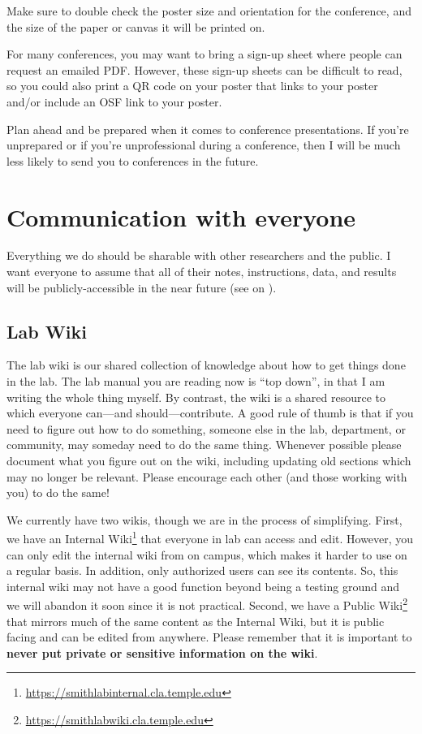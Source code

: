\documentclass[letterpaper,12pt,oneside]{memoir}
\begin{document}
Make sure to double check the poster size and orientation for the conference, and the size of the paper or canvas it will be printed on.

For many conferences, you may want to bring a sign-up sheet where people can request an emailed PDF. However, these sign-up sheets can be difficult to read, so you could also print a QR code on your poster that links to your poster and/or include an OSF link to your poster.

\begin{shaded}
\noindent Plan ahead and be prepared when it comes to conference presentations. If you're unprepared or if you're unprofessional during a conference, then I will be much less likely to send you to conferences in the future.
\end{shaded}


\section{Communication with everyone}
Everything we do should be sharable with other researchers and the public. I want everyone to assume that all of their notes, instructions, data, and results will be publicly-accessible in the near future (see  on ). 

\subsection{Lab Wiki}
\label{sec:wiki}

The lab wiki is our shared collection of knowledge about how to get things done in the lab. The lab manual you are reading now is ``top down'', in that I am writing the whole thing myself. By contrast, the wiki is a shared resource to which everyone can---and should---contribute. A good rule of thumb is that if you need to figure out how to do something, someone else in the lab, department, or community, may someday need to do the same thing. Whenever possible please document what you figure out on the wiki, including updating old sections which may no longer be relevant. Please encourage each other (and those working with you) to do the same!

We currently have two wikis, though we are in the process of simplifying. First, we have an Internal Wiki\footnote{\url{https://smithlabinternal.cla.temple.edu}} that everyone in lab can access and edit. However, you can only edit the internal wiki from on campus, which makes it harder to use on a regular basis. In addition, only authorized users can see its contents. So, this internal wiki may not have a good function beyond being a testing ground and we will abandon it soon since it is not practical. Second, we have a Public Wiki\footnote{\url{https://smithlabwiki.cla.temple.edu}} that mirrors much of the same content as the Internal Wiki, but it is public facing and can be edited from anywhere. Please remember that it is important to \textbf{never put private or sensitive information on the wiki}. 
\end{document}
